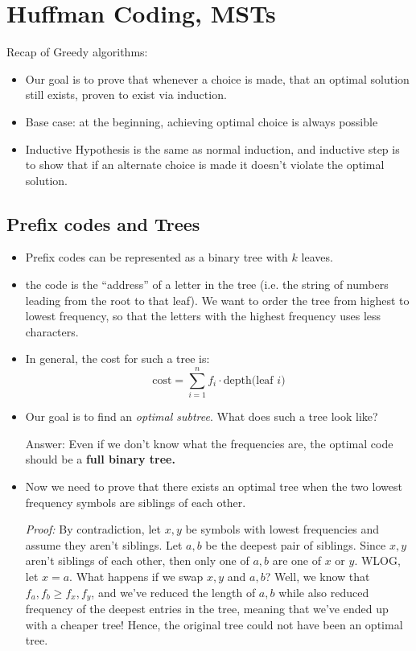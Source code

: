 \documentclass[10pt]{article}
\begin{document}
	\section{Huffman Coding, MSTs}
	Recap of Greedy algorithms:
	\begin{itemize}
		\item Our goal is to prove that whenever a choice is made, that an optimal solution still exists, proven
			to exist via induction.
		\item Base case: at the beginning, achieving optimal choice is always possible
		\item Inductive Hypothesis is the same as normal induction, and inductive step is to show that if 
			an alternate choice is made it doesn't violate the optimal solution.
	\end{itemize}
	\subsection{Prefix codes and Trees}
	\begin{itemize}
		\item Prefix codes can be represented as a binary tree with $k$ leaves. 
		\item the code is the ``address'' of a letter in the tree (i.e. the string of numbers leading from 
			the root to that leaf). We want to order the tree from highest to lowest frequency, so that the 
			letters with the highest frequency uses less characters.
		\item In general, the cost for such a tree is:
			\[
				\mathrm{cost} = \sum_{i = 1}^n f_i \cdot \text{depth(leaf $i$)}
			\] 
		\item Our goal is to find an \textit{optimal subtree}. What does such a tree look like? 

		Answer: Even if 
			we don't know what the frequencies are, the optimal code should be a \textbf{full binary tree.} 

		\item Now
			we need to prove that there exists an optimal tree when the
			two lowest frequency symbols are siblings 
			of each other.

			\textit{Proof:} By contradiction, let $x, y$ be symbols with lowest frequencies and assume they 
			aren't siblings. Let $a, b$ be the deepest pair of siblings. Since $x, y$ aren't siblings 
			of each other, then only one of $a, b$ are one of $x$ or $y$. WLOG, let $x = a$. 
			What happens if we swap $x,y$ and $a, b$? Well, we know that $f_a, f_b \ge f_x, f_y$, and we've 
			reduced the length of $a, b$ while also reduced frequency of the deepest entries in the tree, meaning
			that we've ended up with a cheaper tree! Hence, the original tree could not have 
			been an optimal tree. 
	\end{itemize}
\end{document}
